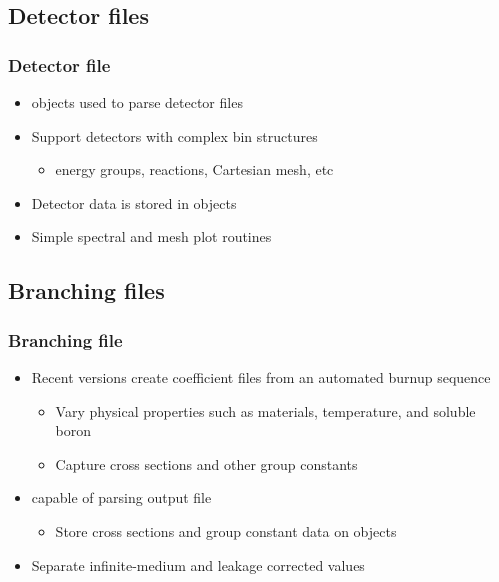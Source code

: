 {\subsection{Detector files}
\begin{frame}
    \frametitle{Detector file}
    \begin{itemize}
        \item {} objects used to parse detector files
        \item Support detectors with complex bin structures
            \begin{itemize}
                \item energy groups, reactions, Cartesian mesh, etc
            \end{itemize}
        \item Detector data is stored in  objects
        \item Simple spectral and mesh plot routines
    \end{itemize}
\end{frame}

\subsection{Branching files}
\begin{frame}
    \frametitle{Branching file}
    \begin{itemize}
        \item Recent \sss versions create coefficient files from an automated burnup sequence 
            \begin{itemize}
                \item Vary physical properties such as materials, temperature, and soluble boron
                \item Capture cross sections and other group constants
            \end{itemize}
        \item {} capable of parsing output file
        \begin{itemize}
            \item Store cross sections and group constant data on  objects
        \end{itemize}
    \item Separate infinite-medium and leakage corrected values
    \end{itemize}
\end{frame}
}  %
